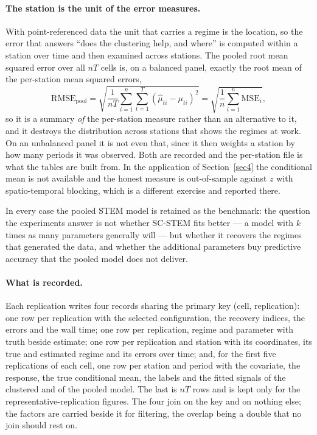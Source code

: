 \paragraph{The station is the unit of the error measures.} With point-referenced data the unit that carries a regime is the location, so the error that answers ``does the clustering help, and where'' is computed within a station over time and then examined across stations. The pooled root mean squared error over all $nT$ cells is, on a balanced panel, exactly the root mean of the per-station mean squared errors,
\begin{equation}
  \mathrm{RMSE}_{\mathrm{pool}}
  = \sqrt{\frac{1}{nT}\sum_{i=1}^{n}\sum_{t=1}^{T} (\hat\mu_{ti} - \mu_{ti})^2}
  = \sqrt{\frac{1}{n}\sum_{i=1}^{n} \mathrm{MSE}_i} ,
  \label{eq:pooledrmse}
\end{equation}
so it is a summary \emph{of} the per-station measure rather than an alternative to it, and it destroys the distribution across stations that shows the regimes at work. On an unbalanced panel it is not even that, since it then weights a station by how many periods it was observed. Both are recorded and the per-station file is what the tables are built from. In the application of Section~\ref{sec4} the conditional mean is not available and the honest measure is out-of-sample against $z$ with spatio-temporal blocking, which is a different exercise and reported there.

In every case the pooled STEM model is retained as the benchmark: the question the experiments answer is not whether SC-STEM fits better --- a model with $k$ times as many parameters generally will --- but whether it recovers the regimes that generated the data, and whether the additional parameters buy predictive accuracy that the pooled model does not deliver.

\paragraph{What is recorded.} Each replication writes four records sharing the primary key (cell, replication): one row per replication with the selected configuration, the recovery indices, the errors and the wall time; one row per replication, regime and parameter with truth beside estimate; one row per replication and station with its coordinates, its true and estimated regime and its errors over time; and, for the first five replications of each cell, one row per station and period with the covariate, the response, the true conditional mean, the labels and the fitted signals of the clustered and of the pooled model. The last is $nT$ rows and is kept only for the representative-replication figures. The four join on the key and on nothing else; the factors are carried beside it for filtering, the overlap being a double that no join should rest on.

